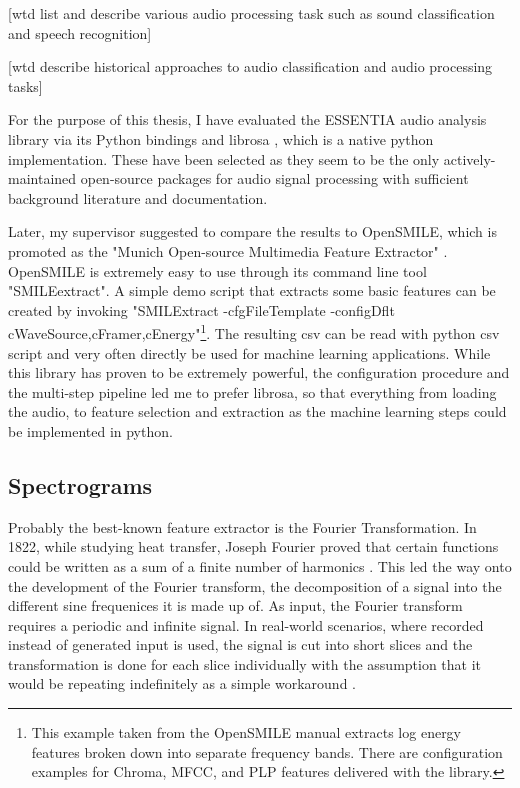 [wtd list and describe various audio processing task such as sound classification and speech recognition]

[wtd describe historical approaches to audio classification and audio processing tasks]


For the purpose of this thesis, I have evaluated the ESSENTIA audio analysis library \cite{bogdanov:Essentia:ACMMULTIMEDIA13} via its Python bindings and librosa \cite{BMcFee:librosa}, which is a native python implementation. 
These have been selected as they seem to be the only actively-maintained open-source packages for audio signal processing with sufficient background literature and documentation. 

Later, my supervisor suggested to compare the results to OpenSMILE, which is promoted as the "Munich Open-source Multimedia Feature Extractor" \cite{Eyben:2013:RDO:2502081.2502224}.
OpenSMILE is extremely easy to use through its command line tool "SMILEextract". A simple demo script that extracts some basic features can be created by invoking "SMILExtract -cfgFileTemplate -configDflt cWaveSource,cFramer,cEnergy"\footnote{This example taken from the OpenSMILE manual extracts log energy features broken down into separate frequency bands. There are configuration examples for Chroma, MFCC, and PLP features delivered with the library.}.
The resulting csv can be read with python csv script and very often directly be used for machine learning applications. While this library has proven to be extremely powerful, the  configuration procedure and the multi-step pipeline led me to prefer librosa, so that everything from loading the audio, to feature selection and extraction as the machine learning steps could be implemented in python.  %

\subsection{Spectrograms}

Probably the best-known feature extractor is the Fourier Transformation. In 1822, while studying heat transfer, Joseph Fourier proved that certain functions could be written as a sum of a finite number of harmonics \cite{fourier1878}. This led the way onto the development of the Fourier transform, the decomposition of a signal into the different sine frequenices it is made up of. As input, the Fourier transform requires a periodic and infinite signal. In real-world scenarios, where recorded instead of generated input is used, the signal is cut into short slices and the transformation is done for each slice individually with the assumption that it would be repeating indefinitely as a simple workaround \cite{Smith97}.

